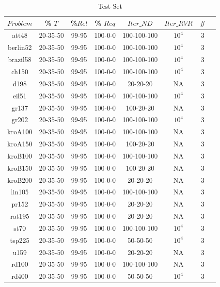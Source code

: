 \begin{table}[H]
\caption{Test-Set} %
\centering  %
\begin{tabular}{|c|c|c|c|c|c|c|c|} %
\hline	$Problem$   &	\% $T$ & \%$Rel$& \% $Req$ & $Iter\_ND$ & $Iter\_RVR$ & \# \\
\hline	att48	&	20-35-50	&	99-95	&	100-0-0	&	100-100-100	&	$10^4$	&	3	\\
\hline	berlin52	&	20-35-50	&	99-95	&	100-0-0	&	100-100-100	&	$10^4$	&	3	\\
\hline	brazil58	&	20-35-50	&	99-95	&	100-0-0	&	100-100-100	&	$10^4$	&	3	\\
\hline	ch150	&	20-35-50	&	99-95	&	100-0-0	&	100-100-100	&	$10^4$	&	3	\\
\hline	d198	&	20-35-50	&	99-95	&	100-0-0	&	20-20-20	&	NA	&	3	\\
\hline	eil51	&	20-35-50	&	99-95	&	100-0-0	&	100-100-100	&	$10^4$	&	3	\\
\hline	gr137	&	20-35-50	&	99-95	&	100-0-0	&	100-20-20	&	NA	&	3	\\
\hline	gr202	&	20-35-50	&	99-95	&	100-0-0	&	100-100-100	&	$10^4$	&	3	\\
\hline	kroA100	&	20-35-50	&	99-95	&	100-0-0	&	100-100-100	&	NA	&	3	\\
\hline	kroA150	&	20-35-50	&	99-95	&	100-0-0	&	100-20-20	&	NA	&	3	\\
\hline	kroB100	&	20-35-50	&	99-95	&	100-0-0	&	100-100-100	&	NA	&	3	\\
\hline	kroB150	&	20-35-50	&	99-95	&	100-0-0	&	100-20-20	&	NA	&	3	\\
\hline	kroB200	&	20-35-50	&	99-95	&	100-0-0	&	20-20-20	&	NA	&	3	\\
\hline	lin105	&	20-35-50	&	99-95	&	100-0-0	&	100-100-100	&	NA	&	3	\\
\hline	pr152	&	20-35-50	&	99-95	&	100-0-0	&	20-20-20	&	NA	&	3	\\
\hline	rat195	&	20-35-50	&	99-95	&	100-0-0	&	20-20-20	&	NA	&	3	\\
\hline	st70	&	20-35-50	&	99-95	&	100-0-0	&	100-100-100	&	$10^4$	&	3	\\
\hline	tsp225	&	20-35-50	&	99-95	&	100-0-0	&	50-50-50	&	$10^4$	&	3	\\
\hline	u159	&	20-35-50	&	99-95	&	100-0-0	&	20-20-20	&	NA	&	3	\\
\hline	rd100	&	20-35-50	&	99-95	&	100-0-0	&	100-100-100	&	NA	&	3	\\
\hline	rd400	&	20-35-50	&	99-95	&	100-0-0	&	50-50-50	&	$10^4$	&	3	\\

\end{tabular}
\end{table}
